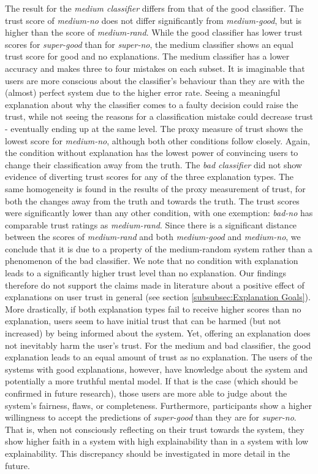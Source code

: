 The result for the \textit{medium classifier} differs from that of the good classifier. The trust score of \textit{medium-no} does not differ significantly from \textit{medium-good}, but is higher than the score of \textit{medium-rand}. While the good classifier has lower trust scores for \textit{super-good} than for \textit{super-no}, the medium classifier shows an equal trust score for good and no explanations. The medium classifier has a lower accuracy and makes three to four mistakes on each subset. It is imaginable that users are more conscious about the classifier's behaviour than they are with the (almost) perfect system due to the higher error rate. Seeing a meaningful explanation about why the classifier comes to a faulty decision could raise the trust, while not seeing the reasons for a classification mistake could decrease trust - eventually ending up at the same level. The proxy measure of trust shows the lowest score for \textit{medium-no}, although both other conditions follow closely. Again, the condition without explanation has the lowest power of convincing users to change their classification away from the truth.\newline
The \textit{bad classifier} did not show evidence of diverting trust scores for any of the three explanation types. The same homogeneity is found in the results of the proxy measurement of trust, for both the changes away from the truth and towards the truth. The trust scores were significantly lower than any other condition, with one exemption: \textit{bad-no} has comparable trust ratings as \textit{medium-rand}. Since there is a significant distance between the scores of \textit{medium-rand} and both \textit{medium-good} and \textit{medium-no}, we conclude that it is due to a property of the medium-random system rather than a phenomenon of the bad classifier.\newline
We note that no condition with explanation leads to a significantly higher trust level than no explanation. Our findings therefore do not support the claims made in literature about a positive effect of explanations on user trust in general (see section \ref{subsubsec:Explanation Goals}). More drastically, if both explanation types fail to receive higher scores than no explanation, users seem to have initial trust that can be harmed (but not increased) by being informed about the system. Yet, offering an explanation does not inevitably harm the user's trust. For the medium and bad classifier, the good explanation leads to an equal amount of trust as no explanation. The users of the systems with good explanations, however, have knowledge about the system and potentially a more truthful mental model. If that is the case (which should be confirmed in future research), those users are more able to judge about the system's fairness, flaws, or completeness. Furthermore, participants show a higher willingness to accept the predictions of \textit{super-good} than they are for \textit{super-no}. That is, when not consciously reflecting on their trust towards the system, they show higher faith in a system with high explainability than in a system with low explainability. This discrepancy should be investigated in more detail in the future.\newline
